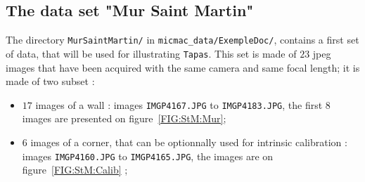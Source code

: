 
\subsection{The data set  "Mur Saint Martin"}



The directory {\tt MurSaintMartin/} in {\tt micmac\_data/ExempleDoc/}, contains
a first set of data, that will be used for illustrating {\tt Tapas}.
This set is made of $23$ jpeg images that have been acquired with the same
camera and same focal length; it is made of two subset :

\begin{itemize}
    \item $17$ images of a wall : images {\tt IMGP4167.JPG} to {\tt IMGP4183.JPG}, the first
	  $8$ images are presented on figure~\ref{FIG:StM:Mur};
    \item $6$ images of a corner, that can be optionnally used for intrinsic calibration
	   : images {\tt IMGP4160.JPG} to {\tt IMGP4165.JPG}, the images are on figure~\ref{FIG:StM:Calib} ;
\end{itemize}



